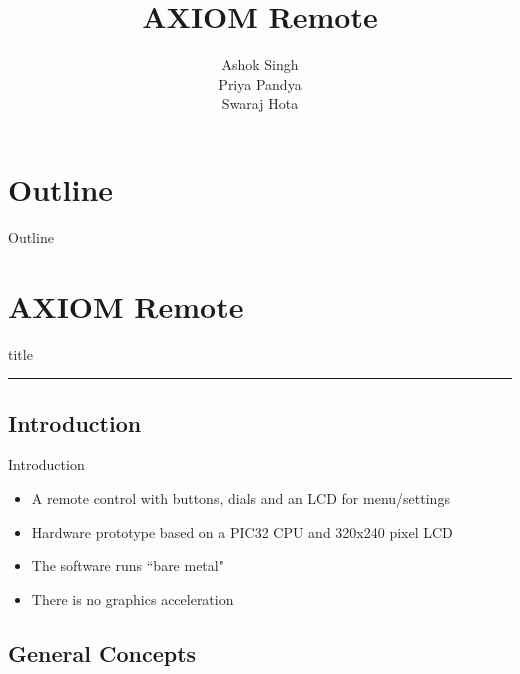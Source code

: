 \documentclass{beamer}
\title{AXIOM Remote}
\author{Ashok Singh \\ Priya Pandya \\ Swaraj Hota}
\date
\begin{document}
{
    \frame{\titlepage}
}

\section*{Outline}

\begin{frame}{Outline}
    \tableofcontents
\end{frame}

\section{AXIOM Remote}

\begin{frame}[plain]
    \begin{beamercolorbox}[sep=8pt,center,shadow=true,rounded=true]{title}
        \insertsectionhead\par
        \color{apertus_orange}\noindent\rule{10cm}{1pt}
    \end{beamercolorbox}
\end{frame}

\subsection{Introduction}

\begin{frame}{Introduction}
	\begin{itemize}
		\item A remote control with buttons, dials and an LCD for menu/settings
		\item Hardware prototype based on a PIC32 CPU and 320x240 pixel LCD
		\item The software runs ``bare metal"
		\item There is no graphics acceleration
	\end{itemize}	

\end{frame}

\subsection{General Concepts}
\end{document}
